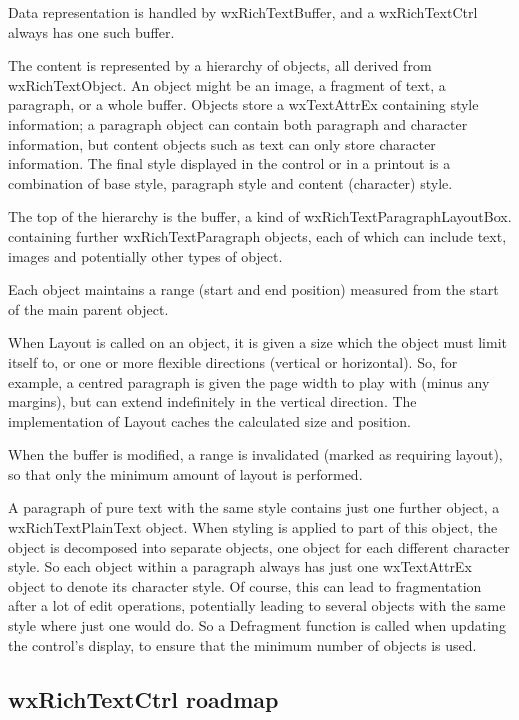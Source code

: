 Data representation is handled by wxRichTextBuffer, and a wxRichTextCtrl
always has one such buffer.

The content is represented by a hierarchy of objects, all derived from
wxRichTextObject. An object might be an image, a fragment of text, a paragraph,
or a whole buffer. Objects store a wxTextAttrEx containing style information;
a paragraph object can contain both paragraph and character information, but
content objects such as text can only store character information. The final
style displayed in the control or in a printout is a combination of base
style, paragraph style and content (character) style.

The top of the hierarchy is the buffer, a kind of wxRichTextParagraphLayoutBox.
containing further wxRichTextParagraph objects, each of which can include text,
images and potentially other types of object.

Each object maintains a range (start and end position) measured
from the start of the main parent object.

When Layout is called on an object, it is given a size which the object
must limit itself to, or one or more flexible directions (vertical
or horizontal). So, for example, a centred paragraph is given the page
width to play with (minus any margins), but can extend indefinitely
in the vertical direction. The implementation of Layout caches the calculated
size and position.

When the buffer is modified, a range is invalidated (marked as requiring
layout), so that only the minimum amount of layout is performed.

A paragraph of pure text with the same style contains just one further
object, a wxRichTextPlainText object. When styling is applied to part of
this object, the object is decomposed into separate objects, one object
for each different character style. So each object within a paragraph always has
just one wxTextAttrEx object to denote its character style. Of course, this can
lead to fragmentation after a lot of edit operations, potentially leading
to several objects with the same style where just one would do. So
a Defragment function is called when updating the control's display, to ensure that
the minimum number of objects is used.

\subsection{wxRichTextCtrl roadmap}

